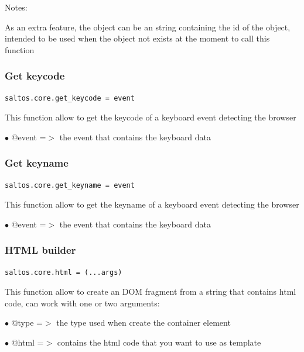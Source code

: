 \documentclass[a4paper]{article}
\begin{document}
Notes:

As an extra feature, the object can be an string containing the id of the object, intended
to be used when the object not exists at the moment to call this function

\hypertarget{toc141}{}
\subsubsection{Get keycode}

\begin{lstlisting}
saltos.core.get_keycode = event
\end{lstlisting}

This function allow to get the keycode of a keyboard event detecting the browser

\begin{compactitem}
\item[\color{myblue}$\bullet$] @event =$>$ the event that contains the keyboard data
\end{compactitem}

\hypertarget{toc142}{}
\subsubsection{Get keyname}

\begin{lstlisting}
saltos.core.get_keyname = event
\end{lstlisting}

This function allow to get the keyname of a keyboard event detecting the browser

\begin{compactitem}
\item[\color{myblue}$\bullet$] @event =$>$ the event that contains the keyboard data
\end{compactitem}

\hypertarget{toc143}{}
\subsubsection{HTML builder}

\begin{lstlisting}
saltos.core.html = (...args)
\end{lstlisting}

This function allow to create an DOM fragment from a string that contains html code, can
work with one or two arguments:

\begin{compactitem}
\item[\color{myblue}$\bullet$] @type =$>$ the type used when create the container element
\item[\color{myblue}$\bullet$] @html =$>$ contains the html code that you want to use as template
\end{compactitem}
\end{document}
